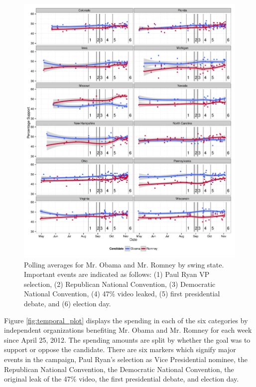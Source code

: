 \documentclass[11pt]{article}\usepackage{graphicx, color}
\newenvironment{knitrout}{}{} %
\begin{document}
\begin{knitrout}
\color{fgcolor}\begin{figure}[H]


{\centering \includegraphics[width=\textwidth]{figure/type_swing_1} 

}

\caption[Polling averages for Mr]{Polling averages for Mr. Obama and Mr. Romney by swing state. Important events are indicated as follows: (1) Paul Ryan VP selection, (2) Republican National Convention, (3) Democratic National Convention, (4) 47\% video leaked, (5) first presidential debate, and (6) election day.\label{fig:type_swing_1}}
\end{figure}


\end{knitrout}



Figure \ref{fig:temporal_plot} displays the spending in each of the six categories by independent organizations benefiting Mr. Obama and Mr. Romney for each week since April 25, 2012. The spending amounts are split by whether the goal was to support or oppose the candidate. There are six markers which signify major events in the campaign, Paul Ryan's selection as Vice Presidential nominee, the Republican National Convention, the Democratic National Convention, the original leak of the 47\% video, the first presidential debate, and election day.
\end{document}
